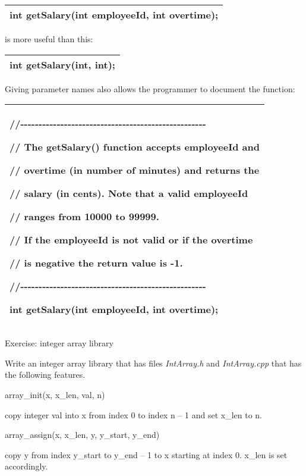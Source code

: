 \documentclass[
]{article}
\begin{document}
\begin{longtable}[]{@{}l@{}}
\toprule
\endhead
int getSalary(int employeeId, int overtime);\tabularnewline
\bottomrule
\end{longtable}

is more useful than this:

\begin{longtable}[]{@{}l@{}}
\toprule
\endhead
int getSalary(int, int); \tabularnewline
\bottomrule
\end{longtable}

Giving parameter names also allows the programmer to document the
function:

\begin{longtable}[]{@{}l@{}}
\toprule
\endhead
\begin{minipage}[t]{0.97\columnwidth}\raggedright
//-\/-\/-\/-\/-\/-\/-\/-\/-\/-\/-\/-\/-\/-\/-\/-\/-\/-\/-\/-\/-\/-\/-\/-\/-\/-\/-\/-\/-\/-\/-\/-\/-\/-\/-\/-\/-\/-\/-\/-\/-\/-\/-\/-\/-\/-\/-\/-\/-\/-\/-

// The getSalary() function accepts \textbf{employeeId} and

// \textbf{overtime} (in number of minutes) and returns the

// salary (in cents). Note that a valid \textbf{employeeId}

// ranges from 10000 to 99999.

// If the \textbf{employeeId} is not valid or if the \textbf{overtime}

// is negative the return value is -1.

//-\/-\/-\/-\/-\/-\/-\/-\/-\/-\/-\/-\/-\/-\/-\/-\/-\/-\/-\/-\/-\/-\/-\/-\/-\/-\/-\/-\/-\/-\/-\/-\/-\/-\/-\/-\/-\/-\/-\/-\/-\/-\/-\/-\/-\/-\/-\/-\/-\/-\/-

int getSalary(int employeeId, int overtime);\strut
\end{minipage}\tabularnewline
\bottomrule
\end{longtable}

Exercise: integer array library

Write an integer array library that has files \emph{IntArray.h} and
\emph{IntArray.cpp }that has the following features.

array\_init(x, x\_len, val, n)

copy integer val into x from index 0 to index n -- 1 and set x\_len to
n.

array\_assign(x, x\_len, y, y\_start, y\_end)

copy y from index y\_start to y\_end -- 1 to x starting at index 0.
x\_len is set accordingly.
\end{document}
